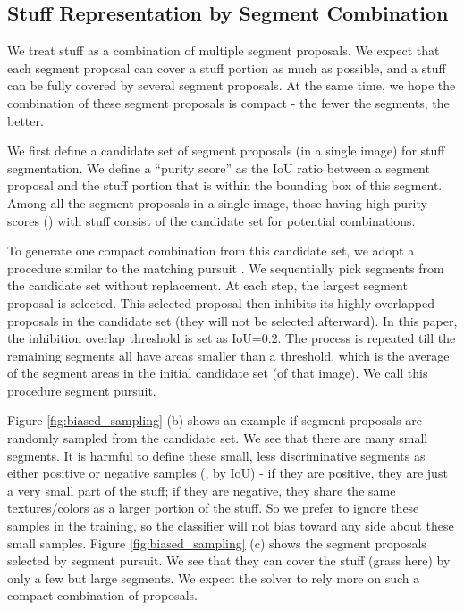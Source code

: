 \documentclass[10pt,twocolumn,letterpaper]{article}
\begin{document}
\subsection{Stuff Representation by Segment Combination}

We treat stuff as a combination of multiple segment proposals. We expect that each segment proposal can cover a stuff portion as much as possible, and a stuff can be fully covered by several segment proposals. At the same time, we hope the combination of these segment proposals is compact - the fewer the segments, the better.

We first define a candidate set of segment proposals (in a single image) for stuff segmentation.
We define a ``purity score'' as the IoU ratio between a segment proposal and the stuff portion that is within the bounding box of this segment. Among all the segment proposals in a single image, those having high purity scores () with stuff consist of the candidate set for potential combinations.

To generate one compact combination from this candidate set, we adopt a procedure similar to the matching pursuit \cite{wu2010learning,mallat1993matching}. We sequentially pick segments from the candidate set without replacement. At each step, the largest segment proposal is selected. This selected proposal then inhibits its highly overlapped proposals in the candidate set (they will not be selected afterward). In this paper, the inhibition overlap threshold is set as IoU=0.2.
The process is repeated till the remaining segments all have areas smaller than a threshold, which is the average of the segment areas in the initial candidate set (of that image). We call this procedure segment pursuit.

Figure \ref{fig:biased_sampling} (b) shows an example if segment proposals are randomly sampled from the candidate set. We see that there are many small segments. It is harmful to define these small, less discriminative segments as either positive or negative samples (\eg, by IoU) - if they are positive, they are just a very small part of the stuff; if they are negative, they share the same textures/colors as a larger portion of the stuff. So we prefer to ignore these samples in the training, so the classifier will not bias toward any side about these small samples.
Figure \ref{fig:biased_sampling} (c) shows the segment proposals selected by segment pursuit. We see that they can cover the stuff (grass here) by only a few but large segments. We expect the solver to rely more on such a compact combination of proposals.
\end{document}
